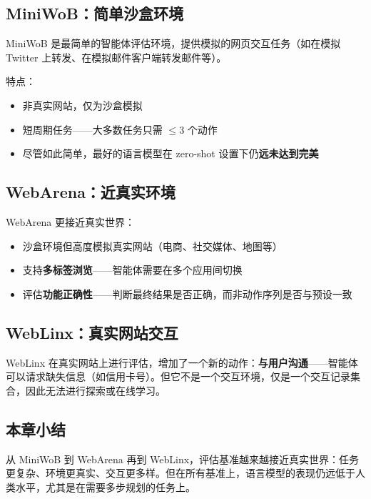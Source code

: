 \documentclass[a4paper]{article}
\begin{document}
\subsection{MiniWoB：简单沙盒环境}

MiniWoB 是最简单的智能体评估环境，提供模拟的网页交互任务（如在模拟 Twitter 上转发、在模拟邮件客户端转发邮件等）。

特点：
\begin{itemize}
    \item 非真实网站，仅为沙盒模拟
    \item 短周期任务——大多数任务只需 $\leq 3$ 个动作
    \item 尽管如此简单，最好的语言模型在 zero-shot 设置下仍\textbf{远未达到完美}
\end{itemize}

\subsection{WebArena：近真实环境}

WebArena 更接近真实世界：

\begin{itemize}
    \item 沙盒环境但高度模拟真实网站（电商、社交媒体、地图等）
    \item 支持\textbf{多标签浏览}——智能体需要在多个应用间切换
    \item 评估\textbf{功能正确性}——判断最终结果是否正确，而非动作序列是否与预设一致
\end{itemize}

\subsection{WebLinx：真实网站交互}

WebLinx 在真实网站上进行评估，增加了一个新的动作：\textbf{与用户沟通}——智能体可以请求缺失信息（如信用卡号）。但它不是一个交互环境，仅是一个交互记录集合，因此无法进行探索或在线学习。





\subsection{本章小结}

从 MiniWoB 到 WebArena 再到 WebLinx，评估基准越来越接近真实世界：任务更复杂、环境更真实、交互更多样。但在所有基准上，语言模型的表现仍远低于人类水平，尤其是在需要多步规划的任务上。
\end{document}
